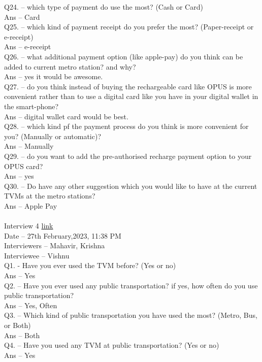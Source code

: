 \documentclass[a4paper, 11pt]{report}
\begin{document}
Q24. – which type of payment do use the most? (Cash or Card) \\
Ans – Card\\
Q25. – which kind of payment receipt do you prefer the most? (Paper-receipt or e-receipt) \\
Ans – e-receipt\\
Q26. – what additional payment option (like apple-pay) do you think can be added to current metro station? and why? \\
Ans – yes it would be awesome. \\
Q27. – do you think instead of buying the rechargeable card like OPUS is more convenient rather than to use a digital card like you have in your digital wallet in the smart-phone? \\
Ans – digital wallet card would be best. \\
Q28. – which kind pf the payment process do you think is more convenient for you? (Manually or automatic)? \\
Ans – Manually\\
Q29. – do you want to add the pre-authorised recharge payment option to your OPUS card? \\
Ans – yes\\
Q30. – Do have any other suggestion which you would like to have at the current TVMs at the metro stations? \\
Ans – Apple Pay \\
\\
Interview 4 \href{https://drive.google.com/file/d/1s_sGqSsWfNolb5bjUEd6yi47pF3mKqgM/view?usp=share_link}{link} \\
Date – 27th February,2023, 11:38 PM\\
Interviewers – Mahavir, Krishna\\
Interviewee – Vishnu\\
Q1. - Have you ever used the TVM before? (Yes or no) \\
Ans – Yes\\
Q2. – Have you ever used any public transportation? if yes, how often do you use public transportation? \\
Ans – Yes, Often\\
Q3. – Which kind of public transportation you have used the most? (Metro, Bus, or Both) \\ 
Ans – Both\\
Q4. – Have you used any TVM at public transportation? (Yes or no) \\
Ans – Yes \\
\end{document}
